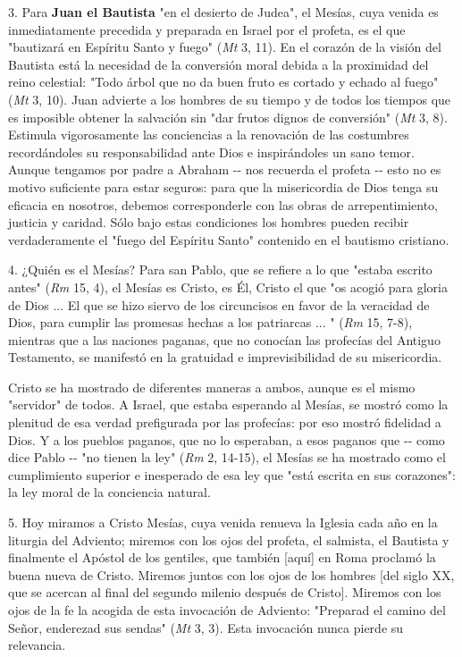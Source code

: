 \begin{body}
\begin{body}
3. Para \textbf{Juan el Bautista} "en el desierto de Judea", el Mesías, cuya venida es inmediatamente precedida y preparada en Israel por el profeta, es el que "bautizará en Espíritu Santo y fuego" (\emph{Mt} 3, 11). En el corazón de la visión del Bautista está la necesidad de la conversión moral debida a la proximidad del reino celestial: "Todo árbol que no da buen fruto es cortado y echado al fuego" (\emph{Mt} 3, 10). Juan advierte a los hombres de su tiempo y de todos los tiempos que es imposible obtener la salvación sin "dar frutos dignos de conversión" (\emph{Mt} 3, 8). Estimula vigorosamente las conciencias a la renovación de las costumbres recordándoles su responsabilidad ante Dios e inspirándoles un sano temor. Aunque tengamos por padre a Abraham -\/- nos recuerda el profeta -\/- esto no es motivo suficiente para estar seguros: para que la misericordia de Dios tenga su eficacia en nosotros, debemos corresponderle con las obras de arrepentimiento, justicia y caridad. Sólo bajo estas condiciones los hombres pueden recibir verdaderamente el "fuego del Espíritu Santo" contenido en el bautismo cristiano.

4. ¿Quién es el Mesías? Para san Pablo, que se refiere a lo que "estaba escrito antes" (\emph{Rm} 15, 4), el Mesías es Cristo, es Él, Cristo el que "os acogió para gloria de Dios ... El que se hizo siervo de los circuncisos en favor de la veracidad de Dios, para cumplir las promesas hechas a los patriarcas ... " (\emph{Rm} 15, 7-8), mientras que a las naciones paganas, que no conocían las profecías del Antiguo Testamento, se manifestó en la gratuidad e imprevisibilidad de su misericordia.

Cristo se ha mostrado de diferentes maneras a ambos, aunque es el mismo "servidor" de todos. A Israel, que estaba esperando al Mesías, se mostró como la plenitud de esa verdad prefigurada por las profecías: por eso mostró fidelidad a Dios. Y a los pueblos paganos, que no lo esperaban, a esos paganos que -\/- como dice Pablo -\/- "no tienen la ley" (\emph{Rm} 2, 14-15), el Mesías se ha mostrado como el cumplimiento superior e inesperado de esa ley que "está escrita en sus corazones": la ley moral de la conciencia natural.

5. Hoy miramos a Cristo Mesías, cuya venida renueva la Iglesia cada año en la liturgia del Adviento; miremos con los ojos del profeta, el salmista, el Bautista y finalmente el Apóstol de los gentiles, que también {[}aquí{]} en Roma proclamó la buena nueva de Cristo. Miremos juntos con los ojos de los hombres {[}del siglo XX, que se acercan al final del segundo milenio después de Cristo{]}. Miremos con los ojos de la fe la acogida de esta invocación de Adviento: "Preparad el camino del Señor, enderezad sus sendas" (\emph{Mt} 3, 3). Esta invocación nunca pierde su relevancia.


\end{body}
\end{body}

